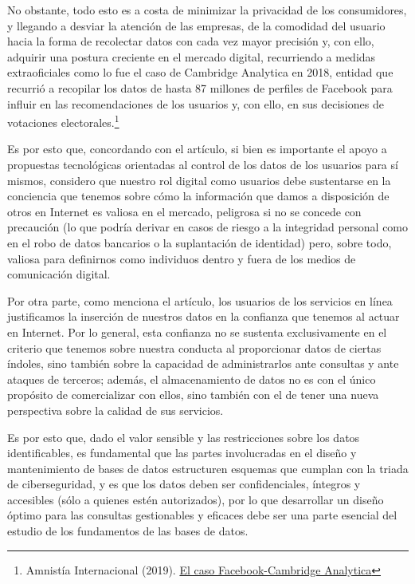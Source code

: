 No obstante, todo esto es a costa de minimizar la privacidad de los consumidores, y llegando a desviar la atención de las empresas, de la comodidad del usuario hacia la forma de recolectar datos con cada vez mayor precisión y, con ello, adquirir una postura creciente en el mercado digital, recurriendo a medidas extraoficiales como lo fue el caso de Cambridge Analytica en 2018, entidad que recurrió a recopilar los datos de hasta 87 millones de perfiles de Facebook para influir en las recomendaciones de los usuarios y, con ello, en sus decisiones de votaciones electorales.\footnote{Amnistía Internacional (2019). \href{https://www.amnesty.org/es/latest/news/2019/07/the-great-hack-facebook-cambridge-analytica/}{El caso Facebook-Cambridge Analytica}}

Es por esto que, concordando con el artículo, si bien es importante el apoyo a propuestas tecnológicas orientadas al control de los datos de los usuarios para sí mismos, considero que nuestro rol digital como usuarios debe sustentarse en la conciencia que tenemos sobre cómo la información que damos a disposición de otros en Internet es valiosa en el mercado, peligrosa si no se concede con precaución (lo que podría derivar en casos de riesgo a la integridad personal como en el robo de datos bancarios o la suplantación de identidad) pero, sobre todo, valiosa para definirnos como individuos dentro y fuera de los medios de comunicación digital.

Por otra parte, como menciona el artículo, los usuarios de los servicios en línea justificamos la inserción de nuestros datos en la confianza que tenemos al actuar en Internet. Por lo general, esta confianza no se sustenta exclusivamente en el criterio que tenemos sobre nuestra conducta al proporcionar datos de ciertas índoles, sino también sobre la capacidad de administrarlos ante consultas y ante ataques de terceros; además, el almacenamiento de datos no es con el único propósito de comercializar con ellos, sino también con el de tener una nueva perspectiva sobre la calidad de sus servicios.

Es por esto que, dado el valor sensible y las restricciones sobre los datos identificables, es fundamental que las partes involucradas en el diseño y mantenimiento de bases de datos estructuren esquemas que cumplan con la triada de ciberseguridad, y es que los datos deben ser confidenciales, íntegros y accesibles (sólo a quienes estén autorizados), por lo que desarrollar un diseño óptimo para las consultas gestionables y eficaces debe ser una parte esencial del estudio de los fundamentos de las bases de datos.

